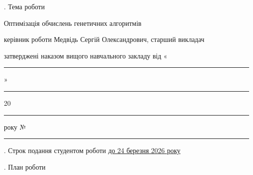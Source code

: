 . Тема роботи {Оптимізація обчислень генетичних алгоритмів

\vspace{0.5cm}
\noindent керівник роботи {Медвідь Сергій Олександрович, старший викладач\hspace{1cm}}

\vspace{0.5cm}
\noindent затверджені наказом вищого навчального закладу від «\rule{0.6cm}{0.4pt}» \rule{2.5cm}{0.4pt} 20\rule{0.6cm}{0.4pt} року № \rule{1.5cm}{0.4pt}}

\vspace{0.2cm}

. Строк подання студентом роботи \underline{до 24 березня 2026 року\hspace{1.5cm}}

\vspace{0.2cm}

. План роботи

\vspace{0.3cm}


